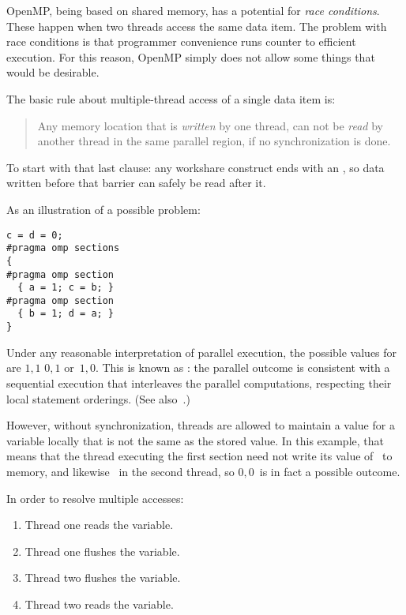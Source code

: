 OpenMP, being based on shared memory, has a potential for \emph{race
  conditions}. These happen when two threads access the same data
item. The problem with race conditions is that programmer convenience
runs counter to efficient execution. For this reason, OpenMP simply
does not allow some things that would be desirable.

The basic rule about multiple-thread access of a single data item is:
\begin{quote}
  Any memory location that is \emph{written} by one thread, can not be
  \emph{read} by another thread in the same parallel region, if no
  synchronization is done.
\end{quote}
To start with that last clause: any workshare construct ends with an
, so data written before that barrier
can safely be read after it.

As an illustration of a possible problem:
\begin{lstlisting}
c = d = 0;
#pragma omp sections
{
#pragma omp section
  { a = 1; c = b; }
#pragma omp section
  { b = 1; d = a; }
}
\end{lstlisting}
Under any reasonable interpretation of parallel execution,
the possible values for  are $1,1$ $0,1$ or~$1,0$.
This is known as :
the parallel outcome is consistent with a sequential execution that
interleaves the parallel computations, respecting their local statement orderings.
(See also~.)

However, without synchronization, threads are allowed to maintain a value for a
variable locally that is not the same as the stored value. In this
example, that means that the thread executing the first section need
not write its value of~ to memory, and likewise ~in the
second thread, so $0,0$~is in fact a possible outcome.

In order to resolve multiple accesses:
\begin{enumerate}
\item Thread one reads the variable.
\item Thread one flushes the variable.
\item Thread two flushes the variable.
\item Thread two reads the variable.
\end{enumerate}


